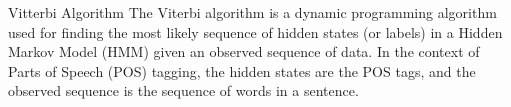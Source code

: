 \begin{frame}{Vitterbi Algorithm}
The Viterbi algorithm is a dynamic programming algorithm used for finding the most likely sequence of hidden states (or labels) in a Hidden Markov Model (HMM) given an observed sequence of data. In the context of Parts of Speech (POS) tagging, the hidden states are the POS tags, and the observed sequence is the sequence of words in a sentence.
\end{frame}